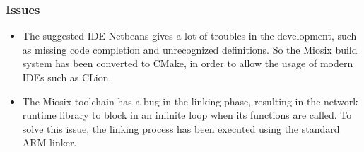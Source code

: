 \documentclass[12pt]{article}
\begin{document}
\subsubsection{Issues}
\begin{itemize}
    \item The suggested IDE Netbeans gives a lot of troubles in the development, such as missing code completion and unrecognized definitions. So the Miosix build system has been converted to CMake, in order to allow the usage of modern IDEs such as CLion.
    \item The Miosix toolchain has a bug in the linking phase, resulting in the network runtime library to block in an infinite loop when its functions are called. To solve this issue, the linking process has been executed using the standard ARM linker.
\end{itemize}
\end{document}
